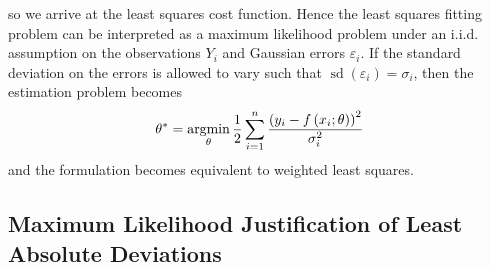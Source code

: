 \documentclass[11pt]{report} %
\begin{document}
so we arrive at the least squares cost function. Hence the least squares fitting problem can be interpreted as a maximum likelihood problem under an i.i.d. assumption on the observations $Y_{i}$ and Gaussian errors $\varepsilon_{i}$. If the standard deviation on the errors is allowed to vary such that $\operatorname{sd}\left(\varepsilon_{i}\right) = \sigma_{i}$, then the estimation problem becomes
\begin{equation}
\theta^{*} = \operatorname*{argmin}_{\theta}\dfrac{1}{2}\sum_{i = 1}^{n}\dfrac{\left(y_{i} - f\left(x_{i};\theta\right)\right)^{2}}{\sigma_{i}^{2}}
\end{equation}
and the formulation becomes equivalent to weighted least squares.

\subsection{Maximum Likelihood Justification of Least Absolute Deviations}
\end{document}
